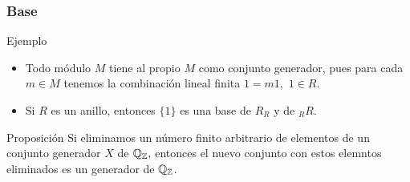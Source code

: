 \documentclass[notes=show]{beamer}%
\providecommand{\U}[1]{\protect\rule{.1in}{.1in}}
\newenvironment{Propo}{\begin{block}{Proposición}}{\end{block}}
\newenvironment{Ej}{\begin{block}{Ejemplo}}{\end{block}}
\begin{document}
\bigskip%
\begin{frame}%


\bigskip%
\frametitle{Base}%


\begin{Ej}
\bigskip

\begin{itemize}
\item Todo módulo $M$ tiene al propio $M$ como conjunto generador, pues
para cada $m\in M$ tenemos la combinación lineal finita $1=m1,$ $1\in R$.

\item Si $R$ es un anillo, entonces $\{1\}$ es una base de $R_{R}$ y de
$_{R}R$.
\end{itemize}
\end{Ej}

\bigskip

\begin{Propo}
Si eliminamos un número finito arbitrario de elementos de un conjunto
generador $X$ de $%
\mathbb{Q}
_{%
\mathbb{Z}
},$ entonces el nuevo conjunto con estos elemntos eliminados es un generador
de $%
\mathbb{Q}
_{%
\mathbb{Z}
}$.
\end{Propo}

%

\transboxout
\end{frame}%


\bigskip

\bigskip

%
\end{document}
